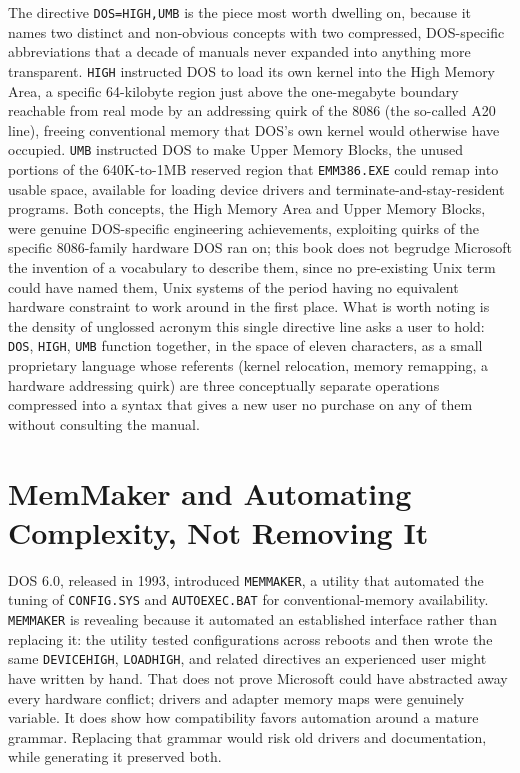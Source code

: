 \documentclass[11pt]{book}
\begin{document}
The directive \texttt{DOS=HIGH,UMB} is the piece most worth dwelling on, because it names two distinct and non-obvious concepts with two compressed, DOS-specific abbreviations that a decade of manuals never expanded into anything more transparent. \texttt{HIGH} instructed DOS to load its own kernel into the High Memory Area, a specific 64-kilobyte region just above the one-megabyte boundary reachable from real mode by an addressing quirk of the 8086 (the so-called A20 line), freeing conventional memory that DOS's own kernel would otherwise have occupied. \texttt{UMB} instructed DOS to make Upper Memory Blocks, the unused portions of the 640K-to-1MB reserved region that \texttt{EMM386.EXE} could remap into usable space, available for loading device drivers and terminate-and-stay-resident programs. Both concepts, the High Memory Area and Upper Memory Blocks, were genuine DOS-specific engineering achievements, exploiting quirks of the specific 8086-family hardware DOS ran on; this book does not begrudge Microsoft the invention of a vocabulary to describe them, since no pre-existing Unix term could have named them, Unix systems of the period having no equivalent hardware constraint to work around in the first place. What is worth noting is the density of unglossed acronym this single directive line asks a user to hold: \texttt{DOS}, \texttt{HIGH}, \texttt{UMB} function together, in the space of eleven characters, as a small proprietary language whose referents (kernel relocation, memory remapping, a hardware addressing quirk) are three conceptually separate operations compressed into a syntax that gives a new user no purchase on any of them without consulting the manual.

\section{MemMaker and Automating Complexity, Not Removing It}

DOS 6.0, released in 1993, introduced \texttt{MEMMAKER}, a utility that automated the tuning of \texttt{CONFIG.SYS} and \texttt{AUTOEXEC.BAT} for conventional-memory availability. \texttt{MEMMAKER} is revealing because it automated an established interface rather than replacing it: the utility tested configurations across reboots and then wrote the same \texttt{DEVICEHIGH}, \texttt{LOADHIGH}, and related directives an experienced user might have written by hand. That does not prove Microsoft could have abstracted away every hardware conflict; drivers and adapter memory maps were genuinely variable. It does show how compatibility favors automation around a mature grammar. Replacing that grammar would risk old drivers and documentation, while generating it preserved both.
\end{document}

